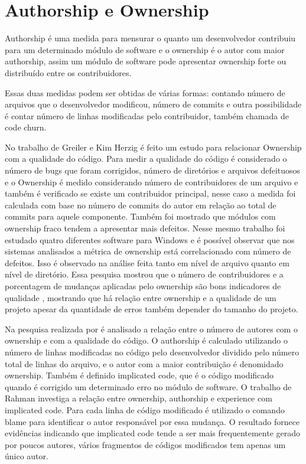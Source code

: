 \section{Authorship e Ownership}
Authorship é uma medida para mensurar o quanto um desenvolvedor contribuiu para um determinado módulo de software e o ownership é o autor com maior authorship, assim um módulo de software pode apresentar ownership forte ou distribuído entre os contribuidores.

Essas duas medidas podem ser obtidas de várias formas: contando número de arquivos que o desenvolvedor modificou, número de commits e outra possibilidade é contar número de linhas modificadas pelo contribuidor, também chamada de code churn\cite{Munson:1998:CCM:850947.853326}.

No trabalho de Greiler e Kim Herzig\cite{Greiler} é feito um estudo para relacionar Ownership com a qualidade do código. Para medir a qualidade do código é considerado o número de bugs que foram corrigidos, número de diretórios e arquivos defeituosos e o Ownership é medido considerando número de contribuidores de um arquivo e também é verificado se existe um contribuidor principal, nesse caso a medida foi calculada com base no número de commits do autor em relação ao total de commits para aquele componente. Também foi mostrado que módulos com ownership fraco tendem a apresentar mais defeitos. Nesse mesmo trabalho foi estudado quatro diferentes software para Windows e é possível observar que nos sistemas analisados a métrica de ownership está correlacionado com número de defeitos. Isso é observado na análise feita tanto em nível de arquivo quanto em nível de diretório.  
Essa pesquisa mostrou que o número de contribuidores e a porcentagem de mudanças aplicadas pelo ownership são bons indicadores de qualidade , mostrando que há relação entre ownership e a qualidade de um projeto apesar da quantidade de erros também depender do tamanho do projeto.

Na pesquisa realizada por  é analisado a relação entre o número de autores com o ownership e com a qualidade do código. O authorship é calculado utilizando o número de linhas modificadas no código pelo desenvolvedor dividido pelo número total de linhas do arquivo, e o autor com a maior contribuição é denomidado ownership. Também é definido implicated code, que é o código modificado quando é corrigido um determinado erro no módulo de software. O trabalho de Rahman investiga a relação entre ownership, authorship e experience com implicated code. Para cada linha de código modificado é utilizado o comando blame para identificar o autor responsável por essa mudança. O resultado fornece evidências indicando que implicated code tende a ser mais frequentemente gerado por poucos autores, vários fragmentos de códigos modificados tem apenas um único autor.

